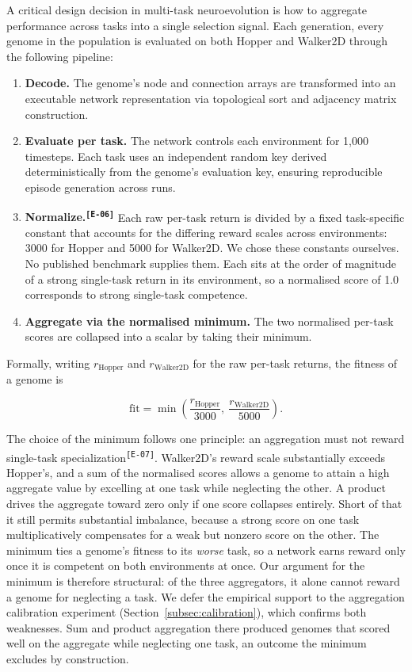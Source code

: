 \documentclass[12pt]{article}
\newcommand{\revID}[1]{\textsuperscript{\scriptsize\texttt{[#1]}}}
\newcommand{\revBrit}[2]{\textcolor{lrBlue}{#2}\revID{#1}}      %
\begin{document}
A critical design decision in multi-task neuroevolution is how to aggregate performance across tasks into a single selection signal.
Each generation, every genome in the population is evaluated on both Hopper and Walker2D through the following pipeline:

\begin{enumerate}
    \item \textbf{Decode.} The genome's node and connection arrays are transformed into an executable network representation via topological sort and adjacency matrix construction.
    \item \textbf{Evaluate per task.} The network controls each environment for 1,000 timesteps. Each task uses an independent random key derived deterministically from the genome's evaluation key, ensuring reproducible episode generation across runs.
    \item \textbf{\revBrit{E-06}{Normalize.}} Each raw per-task return is divided by a fixed task-specific constant that accounts for the differing reward scales across environments: 3000 for Hopper and 5000 for Walker2D. We chose these constants ourselves. No published benchmark supplies them. Each sits at the order of magnitude of a strong single-task return in its environment, so a normalised score of 1.0 corresponds to strong single-task competence.
    \item \textbf{Aggregate via the normalised minimum.} The two normalised per-task scores are collapsed into a scalar by taking their minimum.
\end{enumerate}

Formally, writing $r_{\text{Hopper}}$ and $r_{\text{Walker2D}}$ for the raw per-task returns, the fitness of a genome is

\[\text{fit} = \min\!\left(\frac{r_{\text{Hopper}}}{3000},\ \frac{r_{\text{Walker2D}}}{5000}\right).\]

The choice of the minimum follows one principle: an aggregation must not reward \revBrit{E-07}{single-task specialization}.
Walker2D's reward scale substantially exceeds Hopper's, and a sum of the normalised scores allows a genome to attain a high aggregate value by excelling at one task while neglecting the other.
A product drives the aggregate toward zero only if one score collapses entirely. Short of that it still permits substantial imbalance, because a strong score on one task multiplicatively compensates for a weak but nonzero score on the other.
The minimum ties a genome's fitness to its \emph{worse} task, so a network earns reward only once it is competent on both environments at once.
Our argument for the minimum is therefore structural: of the three aggregators, it alone cannot reward a genome for neglecting a task.
We defer the empirical support to the aggregation calibration experiment (Section~\ref{subsec:calibration}), which confirms both weaknesses. Sum and product aggregation there produced genomes that scored well on the aggregate while neglecting one task, an outcome the minimum excludes by construction.
\end{document}
